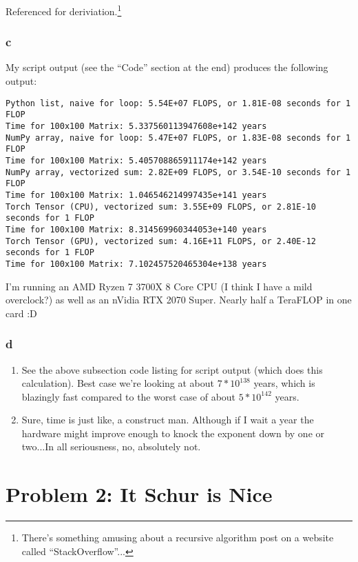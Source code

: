 \documentclass[11pt]{report}
\theoremstyle{definition}
\begin{document}
Referenced \cite{DeterminantStackOverflow} for deriviation.\footnote{There's
	something amusing about a recursive algorithm post on a website called
	``StackOverflow''...}


\subsubsection*{c}
My script output (see the ``Code'' section at the end) produces the following output:
\begin{lstlisting}[basicstyle=\small]
Python list, naive for loop: 5.54E+07 FLOPS, or 1.81E-08 seconds for 1 FLOP
Time for 100x100 Matrix: 5.337560113947608e+142 years
NumPy array, naive for loop: 5.47E+07 FLOPS, or 1.83E-08 seconds for 1 FLOP
Time for 100x100 Matrix: 5.405708865911174e+142 years
NumPy array, vectorized sum: 2.82E+09 FLOPS, or 3.54E-10 seconds for 1 FLOP
Time for 100x100 Matrix: 1.046546214997435e+141 years
Torch Tensor (CPU), vectorized sum: 3.55E+09 FLOPS, or 2.81E-10 seconds for 1 FLOP
Time for 100x100 Matrix: 8.314569960344053e+140 years
Torch Tensor (GPU), vectorized sum: 4.16E+11 FLOPS, or 2.40E-12 seconds for 1 FLOP
Time for 100x100 Matrix: 7.102457520465304e+138 years
\end{lstlisting}
I'm running an AMD Ryzen 7 3700X 8 Core CPU (I think I have a mild overclock?)
as well as an nVidia RTX 2070 Super. Nearly half a TeraFLOP in one card :D

\subsubsection*{d}
\begin{enumerate}
	\item See the above subsection code listing for script output (which does
	      this calculation). Best case we're looking at about $7*10^138$ years, which
	      is blazingly fast compared to the worst case of about $5*10^142$ years.
	\item Sure, time is just like, a construct man. Although if I wait a year
	      the hardware might improve enough to knock the exponent down by one or
	      two...In all seriousness, no, absolutely not.
\end{enumerate}



\newpage

\section*{Problem 2: It Schur is Nice}
\end{document}
